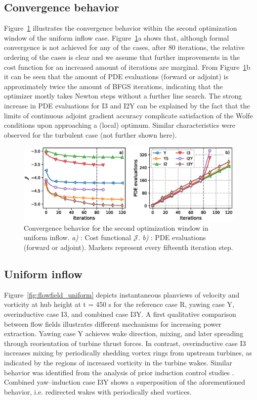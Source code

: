 \documentclass[energies,article,submit,moreauthors,latex,10pt,a4paper]{mdpi}
\begin{document}
\subsection{Convergence behavior}\label{sec:opt_convergence}
\noindent Figure~\ref{fig:convergence} illustrates the convergence behavior within the second optimization window of the uniform inflow case. Figure~\ref{fig:convergence}a shows that, although formal convergence is not achieved for any of the cases, after 80 iterations, the relative ordering of the cases is clear and we assume that further improvements in the cost function for an increased amount of iterations are marginal. From Figure~\ref{fig:convergence}b it can be seen that the amount of PDE evaluations (forward or adjoint) is approximately twice the amount of BFGS iterations, indicating that the optimizer mostly takes Newton steps without a further line search. The strong increase in PDE evaluations for I3 and I2Y can be explained by the fact that the limits of continuous adjoint gradient accuracy complicate satisfaction of the Wolfe conditions upon approaching a (local) optimum. Similar characteristics were observed for the turbulent case (not further shown here).

\begin{figure}
	\includegraphics[width=\textwidth]{figure4}
	\caption{Convergence behavior for the second optimization window in uniform inflow. \emph{a) }: Cost functional $\mathscr{J}$. \emph{b) }: PDE evaluations (forward or adjoint). Markers represent every fifteenth iteration step.\label{fig:convergence}}
\end{figure}

\subsection{Uniform inflow}\label{sec:opt_yaw_uniform}
\noindent Figure~\ref{fig:flowfield_uniform} depicts instantaneous planviews of velocity and vorticity at hub height at t = 450 s for the reference case R, yawing case Y, overinductive case I3, and combined case I3Y. 
A first qualitative comparison between flow fields illustrates different mechanisms for increasing power extraction. Yawing case Y achieves wake direction, mixing, and later spreading through reorientation of turbine thrust forces. In contrast, overinductive case I3 increases mixing by periodically shedding vortex rings from upstream turbines, as indicated by the regions of increased vorticity in the turbine wakes. Similar behavior was identified from the analysis of prior induction control studies \cite{muntersphd}. Combined yaw--induction case I3Y shows a superposition of the aforementioned behavior, i.e. redirected wakes with periodically shed vortices. 
\end{document}
